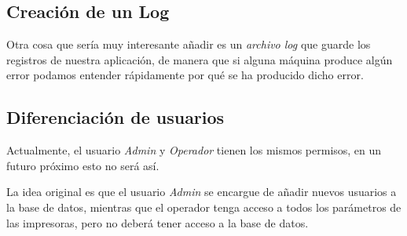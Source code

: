 \subsection{Creación de un Log}

Otra cosa que sería muy interesante añadir es un \textit{ archivo log} que guarde los registros de nuestra aplicación, de manera que si alguna máquina produce algún error podamos entender rápidamente por qué se ha producido dicho error.

\subsection{Diferenciación de usuarios}

Actualmente, el usuario \textit{Admin} y  \textit{Operador} tienen los mismos permisos, en un futuro próximo esto no será así.

La idea original es que el usuario \textit{Admin} se encargue de añadir nuevos usuarios a la base de datos, mientras que el operador tenga acceso a todos los parámetros de las impresoras, pero no deberá tener acceso a la base de datos. 


